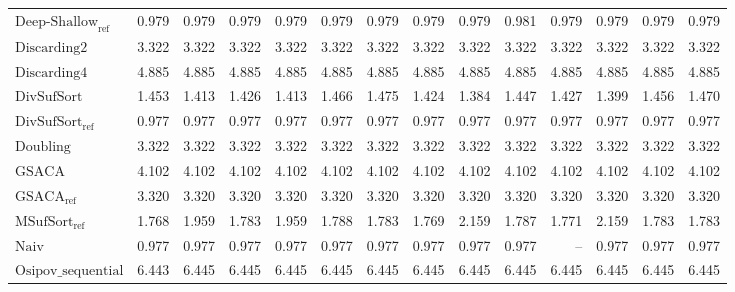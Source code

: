 \begin{table}
{\begin{tabular}{lrrrrrrrrrrrrr}
    $\text{Deep-Shallow}_{\text{ref}}$ & 0.979 & 0.979 & 0.979 & 0.979 & 0.979 & 0.979 & 0.979 & 0.979 & 0.981 & {\color{green!60!black}0.979} & 0.979 & 0.979 & 0.979 \\
    $\text{Discarding2}$ & 3.322 & 3.322 & 3.322 & 3.322 & 3.322 & 3.322 & 3.322 & 3.322 & 3.322 & 3.322 & 3.322 & 3.322 & 3.322 \\
    $\text{Discarding4}$ & 4.885 & 4.885 & 4.885 & 4.885 & 4.885 & 4.885 & 4.885 & 4.885 & 4.885 & 4.885 & 4.885 & 4.885 & 4.885 \\
    $\text{DivSufSort}$ & 1.453 & 1.413 & 1.426 & 1.413 & 1.466 & 1.475 & 1.424 & 1.384 & 1.447 & 1.427 & 1.399 & 1.456 & 1.470 \\
    $\text{DivSufSort}_{\text{ref}}$ & {\color{green!60!black}0.977} & 0.977 & 0.977 & 0.977 & {\color{green!60!black}0.977} & {\color{green!60!black}0.977} & {\color{green!60!black}0.977} & {\color{green!60!black}0.977} & {\color{green!60!black}0.977} & {\color{green!60!black}0.977} & {\color{green!60!black}0.977} & {\color{green!60!black}0.977} & {\color{green!60!black}0.977} \\
    $\text{Doubling}$ & 3.322 & 3.322 & 3.322 & 3.322 & 3.322 & 3.322 & 3.322 & 3.322 & 3.322 & 3.322 & 3.322 & 3.322 & 3.322 \\
    $\text{GSACA}$ & 4.102 & 4.102 & 4.102 & 4.102 & 4.102 & 4.102 & 4.102 & 4.102 & 4.102 & 4.102 & 4.102 & 4.102 & 4.102 \\
    $\text{GSACA}_{\text{ref}}$ & 3.320 & 3.320 & 3.320 & 3.320 & 3.320 & 3.320 & 3.320 & 3.320 & 3.320 & 3.320 & 3.320 & 3.320 & 3.320 \\
    $\text{MSufSort}_{\text{ref}}$ & 1.768 & 1.959 & 1.783 & 1.959 & 1.788 & 1.783 & 1.769 & 2.159 & 1.787 & 1.771 & 2.159 & 1.783 & 1.783 \\
    $\text{Naiv}$ & {\color{green!60!black}0.977} & {\color{green!60!black}0.977} & {\color{green!60!black}0.977} & {\color{green!60!black}0.977} & {\color{green!60!black}0.977} & {\color{green!60!black}0.977} & {\color{green!60!black}0.977} & {\color{green!60!black}0.977} & {\color{green!60!black}0.977} & {\color{darkgray}--} & {\color{green!60!black}0.977} & {\color{green!60!black}0.977} & {\color{green!60!black}0.977} \\
    $\text{Osipov\_sequential}$ & {\color{red}6.443} & {\color{red}6.445} & {\color{red}6.445} & {\color{red}6.445} & {\color{red}6.445} & {\color{red}6.445} & {\color{red}6.445} & {\color{red}6.445} & {\color{red}6.445} & {\color{red}6.445} & {\color{red}6.445} & {\color{red}6.445} & {\color{red}6.445} \\

\end{tabular}}
\end{table}
